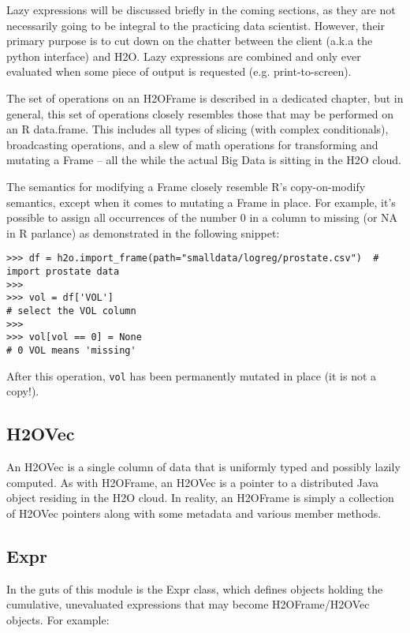 Lazy expressions will be discussed briefly in the coming sections, as they are not necessarily going to be integral to the practicing data scientist. However, their primary purpose is to cut down on the chatter between the client (a.k.a the python interface) and H2O. Lazy expressions are combined and only ever evaluated when some piece of output is requested (e.g. print-to-screen).

The set of operations on an H2OFrame is described in a dedicated chapter, but in general, this set of operations closely resembles those that may be performed on an R data.frame. This includes all types of slicing (with complex conditionals), broadcasting operations, and a slew of math operations for transforming and mutating a Frame -- all the while the actual Big Data is sitting in the H2O cloud. 

The semantics for modifying a Frame closely resemble R's copy-on-modify semantics, except when it comes to mutating a Frame in place. For example, it's possible to assign all occurrences of the number 0 in a column to missing (or NA in R parlance) as demonstrated in the following snippet:

\begin{lstlisting}[style=python]
>>> df = h2o.import_frame(path="smalldata/logreg/prostate.csv")  # import prostate data
>>>
>>> vol = df['VOL']                                              
# select the VOL column
>>>
>>> vol[vol == 0] = None                                         
# 0 VOL means 'missing'
\end{lstlisting}

After this operation, \texttt{vol} has been permanently mutated in place (it is not a copy!).

\subsection{H2OVec}

An H2OVec is a single column of data that is uniformly typed and possibly lazily computed. As with H2OFrame, an H2OVec is a pointer to a distributed Java object residing in the H2O cloud. In reality, an H2OFrame is simply a collection of H2OVec pointers along with some metadata and various member methods.

\subsection{Expr}

In the guts of this module is the Expr class, which defines objects holding the cumulative, unevaluated expressions that may become H2OFrame/H2OVec objects. For example:

